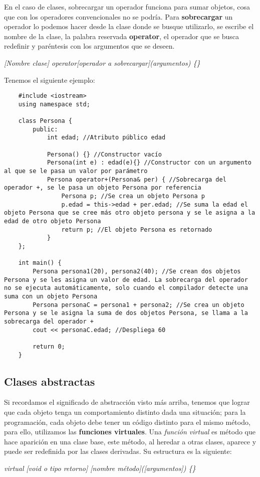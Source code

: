 En el caso de clases, sobrecargar un operador funciona para sumar objetos, cosa que con los operadores convencionales no se podría. Para \textbf{sobrecargar} un operador lo podemos hacer desde la clase donde se busque utilizarlo, se escribe el nombre de la clase, la palabra reservada \textbf{operator}, el operador que se busca redefinir y paréntesis con los argumentos que se deseen.
\begin{center}
    \textit{[Nombre clase] operator[operador a sobrecargar](argumentos) \{\}}
\end{center}

Tenemos el siguiente ejemplo:
\begin{lstlisting}
    #include <iostream>
    using namespace std;
    
    class Persona {
        public:
            int edad; //Atributo público edad

            Persona() {} //Constructor vacío
            Persona(int e) : edad(e){} //Constructor con un argumento al que se le pasa un valor por parámetro
            Persona operator+(Persona& per) { //Sobrecarga del operador +, se le pasa un objeto Persona por referencia
                Persona p; //Se crea un objeto Persona p
                p.edad = this->edad + per.edad; //Se suma la edad el objeto Persona que se cree más otro objeto persona y se le asigna a la edad de otro objeto Persona
                return p; //El objeto Persona es retornado
            }
    };

    int main() {
        Persona persona1(20), persona2(40); //Se crean dos objetos Persona y se les asigna un valor de edad. La sobrecarga del operador no se ejecuta automáticamente, solo cuando el compilador detecte una suma con un objeto Persona
        Persona personaC = persona1 + persona2; //Se crea un objeto Persona y se le asigna la suma de dos objetos Persona, se llama a la sobrecarga del operador +
        cout << personaC.edad; //Despliega 60
        
        return 0;
    }
\end{lstlisting}


\subsection{Clases abstractas}
\hspace{0.55cm}Si recordamos el significado de abstracción visto más arriba, tenemos que lograr que cada objeto tenga un comportamiento distinto dada una situación; para la programación, cada objeto debe tener un código distinto para el mismo método, para ello, utilizamos las \textbf{funciones virtuales}. Una \textit{función virtual} es método que hace aparición en una clase base, este método, al heredar a otras clases, aparece y puede ser redefinida por las clases derivadas. Su estructura es la siguiente:
\begin{center}
    \textit{virtual [void o tipo retorno] [nombre método]([argumentos]) \{\}}
\end{center}

